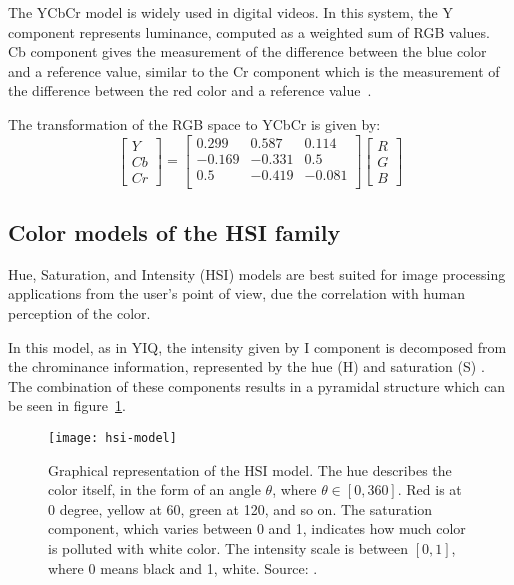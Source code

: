 The YCbCr model is widely used in digital videos. In this system, the Y component represents luminance, computed as a weighted sum of RGB values. Cb component gives the measurement of the difference between the blue color and a reference value, similar to the Cr component which is the measurement of the difference between the red color and a reference value~\citep{pedrini:08}.

The transformation of the RGB space to YCbCr is given by:\\
\begin{equation}
  \begin{bmatrix}
    Y \\ Cb \\ Cr
  \end{bmatrix} = 
  \begin{bmatrix}
     0.299 &  0.587 &  0.114 \\
    -0.169 & -0.331 &  0.5   \\
     0.5   & -0.419 & -0.081 \\
  \end{bmatrix}
  \begin{bmatrix}
    R \\ G \\ B
  \end{bmatrix}
\end{equation}


\subsection{Color models of the HSI family}
\label{sec:modelo_cores_hsi}

Hue, Saturation, and Intensity (HSI) models are best suited for image processing applications from the user's point of view, due the correlation with human perception of the color\citep{konstantinos:00}.

In this model, as in YIQ, the intensity given by I component is decomposed from the chrominance information, represented by the hue (H) and saturation (S) \citep{konstantinos:00}. The combination of these components results in a pyramidal structure which can be seen in figure~\ref{fig:hsi-model}.

\begin{figure}[!ht]
  \centering
  \texttt{[image: hsi-model]}
  \caption[Graphical representation of the HSI model]{Graphical representation of the HSI model. The hue describes the color itself, in the form of an angle $\theta$, where $\theta \in [0, 360]$. Red is at 0 degree, yellow at 60, green at 120, and so on. The saturation component, which varies between 0 and 1, indicates how much color is polluted with white color. The intensity scale is between $[0, 1]$, where 0 means black and 1, white. Source: \citet{blackice:16}.}
  \label{fig:hsi-model} 
\end{figure}

